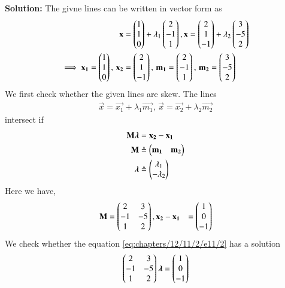 \documentclass[journal,12pt,twocolumn]{IEEEtran}
\begin{document}
\begin{enumerate}
\textbf{Solution:}
\fi
		The givne lines can be written  in vector form  as
\begin{align}
	\mathbf{x} &= \begin{pmatrix}1\\1\\0\end{pmatrix} + \lambda_1\begin{pmatrix}2\\-1\\1\end{pmatrix},
\mathbf{x} = \begin{pmatrix}2\\1\\-1\end{pmatrix} + \lambda_2\begin{pmatrix}3\\-5\\2\end{pmatrix}\\
\implies \mathbf{x_1} = \begin{pmatrix}1\\1\\0\end{pmatrix},\, \mathbf{x_2} &= \begin{pmatrix}2\\1\\-1\end{pmatrix}, \,\mathbf{m_1} = \begin{pmatrix}2\\-1\\1\end{pmatrix}, \, \mathbf{m_2} = \begin{pmatrix}3\\-5\\2\end{pmatrix}
\end{align}
%
We first check whether the given lines are skew. The lines 
\begin{align}
\vec{x} = \vec{x_1} + \lambda_1\vec{m_1},\, \vec{x} = \vec{x_2} + \lambda_2\vec{m_2} 
\label{eq:chapters/12/11/2/e11/1}
\end{align}
intersect if
\begin{align}
\mathbf{M}\bm{\lambda} &= \mathbf{x_2} - \mathbf{x_1}\\
\mathbf{M} &\triangleq \begin{pmatrix}\mathbf{m_1} & \mathbf{m_2}\end{pmatrix} \\
\bm{\lambda} &\triangleq \begin{pmatrix}\lambda_1\\-\lambda_2\end{pmatrix}\\
\end{align}
Here we have,
\begin{align}
\mathbf{M} &= \begin{pmatrix}2&3\\-1&-5\\1&2\end{pmatrix},
\mathbf{x_2} - \mathbf{x_1} &= \begin{pmatrix}1\\0\\-1\end{pmatrix}
\end{align}
We check whether the equation \eqref{eq:chapters/12/11/2/e11/2} has a solution
\begin{align}
\begin{pmatrix}2&3\\-1&-5\\1&2\end{pmatrix}\bm{\lambda} = \begin{pmatrix}1\\0\\-1\end{pmatrix}
\label{eq:chapters/12/11/2/e11/2}
\end{align}

\end{enumerate}
\end{document}
